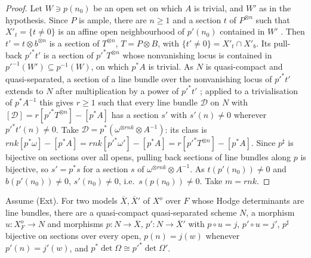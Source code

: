 \begin{proof}
Let $W\ni p(n_0)$ be an open set on which $A$ is trivial, and $W'$ as in the hypothesis. Since $P$ is ample,
there are $n\ge1$ and a section $t$ of $P^{\otimes n}$ such that $X'_t=\{t\ne0\}$ is an affine open
neighbourhood of $p'(n_0)$ contained in $W'$ \cite[4.5.2]{Grothendieck1961ega2}. Then $t'=t\otimes b^{\otimes n}$ is a
section of $T^{\otimes n}$, $T=P\otimes B$, with $\{t'\ne0\}=X'_t\cap X'_b$. Its pull-back $p'^*t'$ is a
section of $p'^*T^{\otimes n}$ whose nonvanishing locus is contained in $p'^{-1}(W')\subseteq p^{-1}(W)$, on
which $p^*A$ is trivial. As $N$ is quasi-compact and quasi-separated, a section of a line bundle over
the nonvanishing locus of $p'^*t'$ extends to $N$ after multiplication by a power of $p'^*t'$
\cite[II, Lemma 5.14]{Hartshorne1977}; applied to a trivialisation of $p^*A^{-1}$ this gives $r\ge1$ such
that every line bundle $\mathcal D$ on $N$ with $[\mathcal D]=r[p'^*T^{\otimes n}]-[p^*A]$ has a section
$s'$ with $s'(n)\ne0$ wherever $p'^*t'(n)\ne0$. Take $\mathcal D=p^*(\omega^{\otimes rnk}\otimes A^{-1})$: its
class is $rnk[p^*\omega]-[p^*A]=rnk[p'^*\omega']-[p^*A]=r[p'^*T^{\otimes n}]-[p^*A]$. Since $p^\sharp$ is
bijective on sections over all opens, pulling back sections of line bundles along $p$ is bijective, so
$s'=p^*s$ for a section $s$ of $\omega^{\otimes rnk}\otimes A^{-1}$. As $t(p'(n_0))\ne0$ and
$b(p'(n_0))\ne0$, $s'(n_0)\ne0$, i.e.\ $s(p(n_0))\ne0$. Take $m=rnk$.
\end{proof}

\begin{lemma}\label{pf:lift1:commonmod}
Assume (Ext). For two models $\overline X,\overline X'$ of $X^o$ over $F$ whose Hodge determinants are line
bundles, there are a quasi-compact quasi-separated scheme $N$, a morphism $u\colon X^o_F\to N$ and
morphisms $p\colon N\to\overline X$, $p'\colon N\to\overline X'$ with $p\circ u=j$, $p'\circ u=j'$,
$p^\sharp$ bijective on sections over every open, $p(n)=j(w)$ whenever $p'(n)=j'(w)$, and
$p^*\det\Omega\cong p'^*\det\Omega'$.
\end{lemma}

